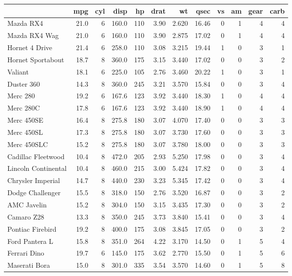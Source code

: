 \documentclass[
]{book}
\theoremstyle{definition}
\theoremstyle{definition}
\theoremstyle{definition}
\theoremstyle{definition}
\theoremstyle{remark}
\begin{document}
\begin{tabular}{l|r|r|r|r|r|r|r|r|r|r|r}
\hline
  & mpg & cyl & disp & hp & drat & wt & qsec & vs & am & gear & carb\\
\hline
Mazda RX4 & 21.0 & 6 & 160.0 & 110 & 3.90 & 2.620 & 16.46 & 0 & 1 & 4 & 4\\
\hline
Mazda RX4 Wag & 21.0 & 6 & 160.0 & 110 & 3.90 & 2.875 & 17.02 & 0 & 1 & 4 & 4\\
\hline
Hornet 4 Drive & 21.4 & 6 & 258.0 & 110 & 3.08 & 3.215 & 19.44 & 1 & 0 & 3 & 1\\
\hline
Hornet Sportabout & 18.7 & 8 & 360.0 & 175 & 3.15 & 3.440 & 17.02 & 0 & 0 & 3 & 2\\
\hline
Valiant & 18.1 & 6 & 225.0 & 105 & 2.76 & 3.460 & 20.22 & 1 & 0 & 3 & 1\\
\hline
Duster 360 & 14.3 & 8 & 360.0 & 245 & 3.21 & 3.570 & 15.84 & 0 & 0 & 3 & 4\\
\hline
Merc 280 & 19.2 & 6 & 167.6 & 123 & 3.92 & 3.440 & 18.30 & 1 & 0 & 4 & 4\\
\hline
Merc 280C & 17.8 & 6 & 167.6 & 123 & 3.92 & 3.440 & 18.90 & 1 & 0 & 4 & 4\\
\hline
Merc 450SE & 16.4 & 8 & 275.8 & 180 & 3.07 & 4.070 & 17.40 & 0 & 0 & 3 & 3\\
\hline
Merc 450SL & 17.3 & 8 & 275.8 & 180 & 3.07 & 3.730 & 17.60 & 0 & 0 & 3 & 3\\
\hline
Merc 450SLC & 15.2 & 8 & 275.8 & 180 & 3.07 & 3.780 & 18.00 & 0 & 0 & 3 & 3\\
\hline
Cadillac Fleetwood & 10.4 & 8 & 472.0 & 205 & 2.93 & 5.250 & 17.98 & 0 & 0 & 3 & 4\\
\hline
Lincoln Continental & 10.4 & 8 & 460.0 & 215 & 3.00 & 5.424 & 17.82 & 0 & 0 & 3 & 4\\
\hline
Chrysler Imperial & 14.7 & 8 & 440.0 & 230 & 3.23 & 5.345 & 17.42 & 0 & 0 & 3 & 4\\
\hline
Dodge Challenger & 15.5 & 8 & 318.0 & 150 & 2.76 & 3.520 & 16.87 & 0 & 0 & 3 & 2\\
\hline
AMC Javelin & 15.2 & 8 & 304.0 & 150 & 3.15 & 3.435 & 17.30 & 0 & 0 & 3 & 2\\
\hline
Camaro Z28 & 13.3 & 8 & 350.0 & 245 & 3.73 & 3.840 & 15.41 & 0 & 0 & 3 & 4\\
\hline
Pontiac Firebird & 19.2 & 8 & 400.0 & 175 & 3.08 & 3.845 & 17.05 & 0 & 0 & 3 & 2\\
\hline
Ford Pantera L & 15.8 & 8 & 351.0 & 264 & 4.22 & 3.170 & 14.50 & 0 & 1 & 5 & 4\\
\hline
Ferrari Dino & 19.7 & 6 & 145.0 & 175 & 3.62 & 2.770 & 15.50 & 0 & 1 & 5 & 6\\
\hline
Maserati Bora & 15.0 & 8 & 301.0 & 335 & 3.54 & 3.570 & 14.60 & 0 & 1 & 5 & 8\\
\hline
\end{tabular}
\end{document}
